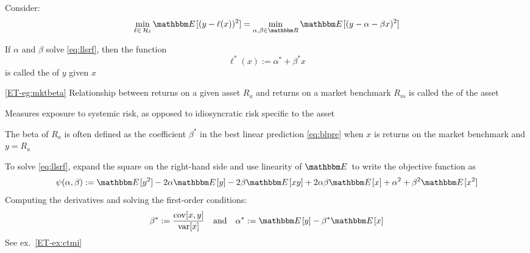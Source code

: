 \begin{frame}

    \vspace{2em}
    Consider:
    \begin{equation}
        \label{eq:llsrf}
        \min_{\ell \in \, \llL} \EE[ (y - \ell(x))^2 ] 
        = \min_{\alpha, \beta \in \RR} \EE[ (y - \alpha - \beta x)^2 ] 
    \end{equation}
    
    \vspace{.7em}
    If $\alpha$ and $\beta$ solve \eqref{eq:llsrf}, then the function
    \begin{equation}
        \label{eq:blpre}
        \ell^*(x) := \alpha^* + \beta^* x
    \end{equation}
    is called the  of $y$ given $x$
    
\end{frame}

\begin{frame}

    \vspace{2em}
    \Eg\eqref{ET-eg:mktbeta}
    Relationship between returns on a given asset $R_a$ and returns
    on a market benchmark $R_m$ is called the  of the asset
    
    Measures
    exposure to systemic risk, as opposed to idiosyncratic risk specific to
    the asset
    
    \vspace{.7em}
    The beta of $R_a$ is often defined as the coefficient
    $\beta^*$ in the best linear prediction \eqref{eq:blpre} when $x$ is
    returns on the market benchmark and $y=R_a$
    
\end{frame}

\begin{frame}

    \vspace{2em}
    To solve \eqref{eq:llsrf}, expand the square on the right-hand side and
    use linearity of $\EE$ to write the objective function as
    \begin{equation*}
        \psi(\alpha, \beta) 
        := \EE [y^2] - 2 \alpha \EE[y] - 2 \beta \EE[xy] + 2\alpha\beta \EE[x]
            + \alpha^2 + \beta^2 \EE[x^2]
    \end{equation*}
    Computing the derivatives and solving the first-order conditions:
    \begin{equation}
        \label{eq:slpp}
        \beta^* := \frac{\cov[x,y]}{\var[x]}
        \quad \text{and} \quad
        \alpha^* := \EE[y] - \beta^* \EE[x]
    \end{equation}
    See ex.~\ref{ET-ex:ctmi}
    
\end{frame}

